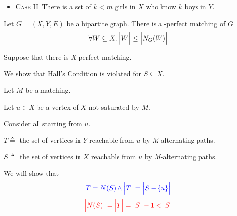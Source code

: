 \begin{frame}{}
  \begin{itemize}
    \item \textsc{Case II:} There is a set of $k < m$ girls in $X$
      who know $k$ boys in $Y$.
  \end{itemize}
\end{frame}

\begin{frame}{}
  \begin{theorem}
    Let $G = (X, Y, E)$ be a bipartite graph.
    There is a -perfect matching of $G$ 
    \[
      \forall W \subseteq X.\; \Big\lvert W \Big\rvert \le \Big\lvert N_{G}(W) \Big\rvert
    \]
  \end{theorem}
\end{frame}

\begin{frame}{}
  \begin{center}

    \pause
    \vspace{0.30cm}
    Suppose that there is  $X$-perfect matching.

    \pause
    \vspace{0.20cm}
    We show that Hall's Condition is violated for  $S \subseteq X$.

    \pause

    \pause
    Let $M$ be a  matching.

    \pause
    \vspace{0.20cm}
    Let $u \in X$ be a vertex of $X$ not saturated by $M$.

    \pause
    \vspace{0.20cm}
    Consider all  starting from $u$.
  \end{center}
\end{frame}

\begin{frame}{}
  \begin{center}

    \vspace{0.50cm}
    $T \triangleq$ the set of vertices in $Y$ reachable from $u$ by $M$-alternating paths.

    \pause
    \vspace{0.20cm}
    $S \triangleq$ the set of vertices in $X$ reachable from $u$ by $M$-alternating paths.

    \pause
    \vspace{0.60cm}
    We will show that
    \[
      \textcolor{blue}{T = N(S) \land \Big\lvert T \Big\rvert = \Big\lvert S - \{u\} \Big\rvert}
    \]
    \pause
    \[
      \textcolor{red}{\Big\lvert N(S) \Big\rvert = \Big\lvert T \Big\rvert = \Big\lvert S \Big\rvert - 1 < \Big\lvert S \Big\rvert}
    \]
  \end{center}
\end{frame}

